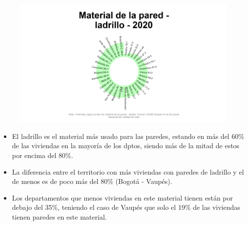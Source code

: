     \begin{figure}[H]
        \caption[Viviendas con pared de ladrillo por departamentos para 2020 ]{\label{pared_ladrillo_dptos} }
        \begin{center}
        \includegraphics[width=\textwidth,keepaspectratio]{img/var_150_static.png}
        \end{center}
    \end{figure}
            \begin{itemize}
                    \item El ladrillo es el material más usado para las paredes, estando en más del 60\% de las viviendas en la mayoría de los dptos, siendo más de la mitad de estos por encima del 80\%.
                    \item La diferencia entre el territorio con más viviendas con paredes de ladrillo y el de menos es de poco más del 80\% (Bogotá - Vaupés).
                    \item Los departamentos que menos viviendas en este material tienen están por debajo del 35\%, teniendo el caso de Vaupés que solo el 19\% de las viviendas tienen paredes en este material.
                    \end{itemize}

